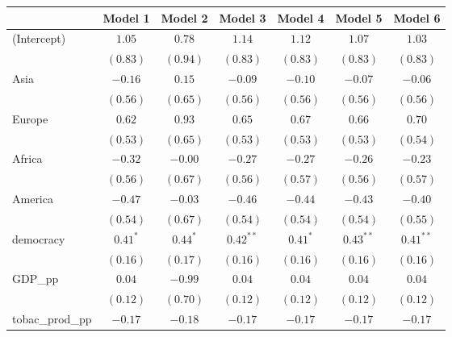 
\begin{table}[!h]
\begin{center}
\begin{tabular}{l c c c c c c }
\toprule
 & Model 1 & Model 2 & Model 3 & Model 4 & Model 5 & Model 6 \\
\midrule
(Intercept)             & $1.05$       & $0.78$      & $1.14$       & $1.12$       & $1.07$       & $1.03$       \\
                        & $(0.83)$     & $(0.94)$    & $(0.83)$     & $(0.83)$     & $(0.83)$     & $(0.83)$     \\
Asia                    & $-0.16$      & $0.15$      & $-0.09$      & $-0.10$      & $-0.07$      & $-0.06$      \\
                        & $(0.56)$     & $(0.65)$    & $(0.56)$     & $(0.56)$     & $(0.56)$     & $(0.56)$     \\
Europe                  & $0.62$       & $0.93$      & $0.65$       & $0.67$       & $0.66$       & $0.70$       \\
                        & $(0.53)$     & $(0.65)$    & $(0.53)$     & $(0.53)$     & $(0.53)$     & $(0.54)$     \\
Africa                  & $-0.32$      & $-0.00$     & $-0.27$      & $-0.27$      & $-0.26$      & $-0.23$      \\
                        & $(0.56)$     & $(0.67)$    & $(0.56)$     & $(0.57)$     & $(0.56)$     & $(0.57)$     \\
America                 & $-0.47$      & $-0.03$     & $-0.46$      & $-0.44$      & $-0.43$      & $-0.40$      \\
                        & $(0.54)$     & $(0.67)$    & $(0.54)$     & $(0.54)$     & $(0.54)$     & $(0.55)$     \\
democracy               & $0.41^{*}$   & $0.44^{*}$  & $0.42^{**}$  & $0.41^{*}$   & $0.43^{**}$  & $0.41^{**}$  \\
                        & $(0.16)$     & $(0.17)$    & $(0.16)$     & $(0.16)$     & $(0.16)$     & $(0.16)$     \\
GDP\_pp                 & $0.04$       & $-0.99$     & $0.04$       & $0.04$       & $0.04$       & $0.04$       \\
                        & $(0.12)$     & $(0.70)$    & $(0.12)$     & $(0.12)$     & $(0.12)$     & $(0.12)$     \\
tobac\_prod\_pp         & $-0.17$      & $-0.18$     & $-0.17$      & $-0.17$      & $-0.17$      & $-0.17$      \\

\end{tabular}
\end{center}
\end{table}
